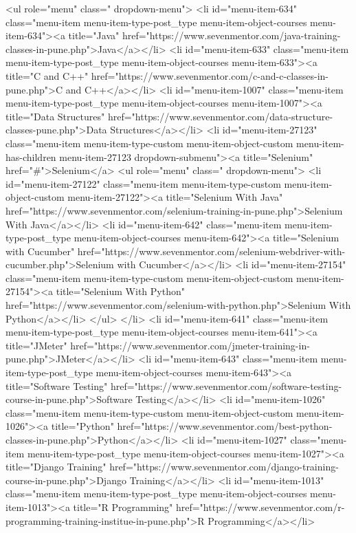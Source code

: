 {<ul role="menu" class=" dropdown-menu">
<li id="menu-item-634" class="menu-item menu-item-type-post_type menu-item-object-courses menu-item-634"><a title="Java" href="https://www.sevenmentor.com/java-training-classes-in-pune.php">Java</a></li>
<li id="menu-item-633" class="menu-item menu-item-type-post_type menu-item-object-courses menu-item-633"><a title="C  and  C++" href="https://www.sevenmentor.com/c-and-c-classes-in-pune.php">C and C++</a></li>
<li id="menu-item-1007" class="menu-item menu-item-type-post_type menu-item-object-courses menu-item-1007"><a title="Data Structures" href="https://www.sevenmentor.com/data-structure-classes-pune.php">Data Structures</a></li>
<li id="menu-item-27123" class="menu-item menu-item-type-custom menu-item-object-custom menu-item-has-children menu-item-27123 dropdown-submenu"><a title="Selenium" href="#">Selenium</a>
<ul role="menu" class=" dropdown-menu">
<li id="menu-item-27122" class="menu-item menu-item-type-custom menu-item-object-custom menu-item-27122"><a title="Selenium With Java" href="https://www.sevenmentor.com/selenium-training-in-pune.php">Selenium With Java</a></li>
<li id="menu-item-642" class="menu-item menu-item-type-post_type menu-item-object-courses menu-item-642"><a title="Selenium  with Cucumber" href="https://www.sevenmentor.com/selenium-webdriver-with-cucumber.php">Selenium with Cucumber</a></li>
<li id="menu-item-27154" class="menu-item menu-item-type-custom menu-item-object-custom menu-item-27154"><a title="Selenium With Python" href="https://www.sevenmentor.com/selenium-with-python.php">Selenium With Python</a></li>
</ul>
</li>
<li id="menu-item-641" class="menu-item menu-item-type-post_type menu-item-object-courses menu-item-641"><a title="JMeter" href="https://www.sevenmentor.com/jmeter-training-in-pune.php">JMeter</a></li>
<li id="menu-item-643" class="menu-item menu-item-type-post_type menu-item-object-courses menu-item-643"><a title="Software Testing" href="https://www.sevenmentor.com/software-testing-course-in-pune.php">Software Testing</a></li>
<li id="menu-item-1026" class="menu-item menu-item-type-custom menu-item-object-custom menu-item-1026"><a title="Python" href="https://www.sevenmentor.com/best-python-classes-in-pune.php">Python</a></li>
<li id="menu-item-1027" class="menu-item menu-item-type-post_type menu-item-object-courses menu-item-1027"><a title="Django Training" href="https://www.sevenmentor.com/django-training-course-in-pune.php">Django Training</a></li>
<li id="menu-item-1013" class="menu-item menu-item-type-post_type menu-item-object-courses menu-item-1013"><a title="R Programming" href="https://www.sevenmentor.com/r-programming-training-institue-in-pune.php">R Programming</a></li>
}
